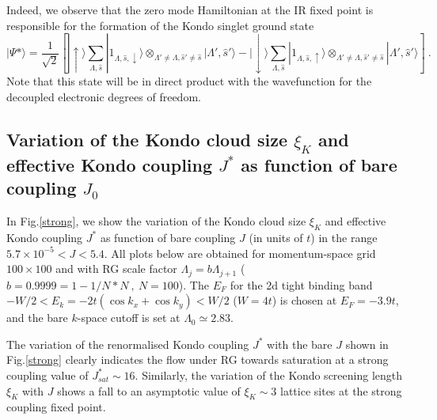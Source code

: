 \documentclass[aps,prb,preprint,groupedaddress]{revtex4-2}
\begin{document}
\par\noindent 
Indeed, we observe that the zero mode Hamiltonian at the IR fixed point is responsible for the formation of the Kondo singlet ground state
\begin{equation}
|\Psi*\rangle=\frac{1}{\sqrt{2}}\left[|\uparrow\rangle\sum_{\Lambda,\hat{s}}|1_{\Lambda,\hat{s},\downarrow}\rangle\otimes_{\Lambda'\neq\Lambda,\hat{s}'\neq \hat{s}}|\Lambda',\hat{s}'\rangle-|\downarrow\rangle\sum_{\Lambda,\hat{s}}|1_{\Lambda,\hat{s},\uparrow}\rangle\otimes_{\Lambda'\neq\Lambda,\hat{s}'\neq \hat{s}}|\Lambda',\hat{s}'\rangle\right]~.\label{eigState}
\end{equation}
Note that this state will be in direct product with the wavefunction for the decoupled electronic degrees of freedom.
\subsection{Variation of the Kondo cloud size $\xi_{K}$ and effective Kondo coupling $J^{*}$ as function of bare coupling $J_{0}$}
In Fig.\ref{strong}, we show the variation of the Kondo cloud size $\xi_{K}$ and effective Kondo coupling $J^{*}$ as function of bare coupling $J$ (in units of $t$) in the range $5.7\times 10^{-5}<J<5.4$.
All plots below are obtained for momentum-space grid $100\times 100$ and with RG scale factor $\Lambda_{j}=b\Lambda_{j+1}$ ($b=0.9999 = 1-1/N*N~,~N=100$). The $E_{F}$ for the 2d tight binding band $-W/2<E_{k}=-2t(\cos k_{x}+\cos k_{y})<W/2$ ($W=4t$) is chosen at $E_{F}=-3.9t$, and the bare $k$-space cutoff is set at $\Lambda_{0}\simeq 2.83$. 
\par\noindent
The variation of the renormalised Kondo coupling $J^{*}$ with the bare $J$ shown in Fig.\ref{strong} clearly indicates the flow under RG towards saturation at a strong coupling value of $J^{*}_{sat}\sim 16$. Similarly, the variation of the Kondo screening length $\xi_{K}$ with $J$ shows a fall to an asymptotic value of $\xi_{K}\sim 3$ lattice sites at the strong coupling fixed point.
\end{document}
